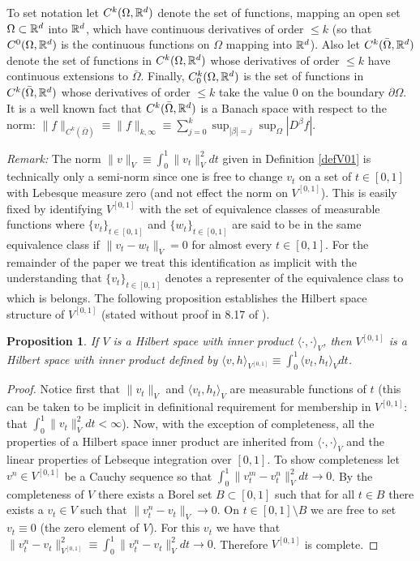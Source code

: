 \documentclass[noinfoline]{imsart}
\newtheorem{proposition}{Proposition}
\begin{document}
To set notation  let $C^k(\Omega, \Bbb R^d)$ denote the set of functions, mapping an open set $\Omega\subset \Bbb R^d$ into $\Bbb R^d$, which have continuous derivatives of order $\leq k$ (so that $C^0(\Omega, \Bbb R^d)$ is the continuous functions on $\Omega$ mapping into $\Bbb R^d$).
Also let $C^k(\bar\Omega,\Bbb R^d)$ denote the set of functions in $C^k(\Omega,\Bbb R^d)$ whose derivatives of order $\leq k$ have continuous extensions to $\bar\Omega$. Finally, $C_0^k(\Omega,\Bbb R^d)$ is the set of functions in $C^k(\bar\Omega,\Bbb R^d)$ whose derivatives of order $\leq k$ take the value $0$ on the boundary $\partial \Omega$. It is a well known fact that  $C^k(\bar\Omega,\Bbb R^d)$ is a Banach space with respect to the norm:  $ \| f \|_{C^k(\bar \Omega)}\equiv \| f \|_{k,\infty}\equiv \sum_{j=0}^k \sup_{|\beta|=j}\sup_{\Omega} |D^\beta f|$.



{\em Remark:} The norm $\| v\|_V\equiv \int_0^1 \| v_t\|^2_V dt $ given in Definition \ref{defV01} is technically only a semi-norm since one is free to change $v_t$  on a set of $t\in[0,1]$ with Lebesque measure zero (and not effect the norm on $V^{[0,1]}$). This is easily fixed by identifying  $V^{[0,1]}$ with the set of equivalence classes of measurable functions where $\{v_t\}_{t\in [0,1]}$ and $\{w_t\}_{t\in [0,1]}$ are said to be in the same equivalence class if $\| v_t-w_t \|_V=0$ for almost every $t\in [0,1]$. For the remainder of the paper we treat this identification as implicit with the understanding that $\{v_t\}_{t\in[0,1]}$  denotes a representer of the equivalence class to which is belongs. The following proposition establishes the Hilbert space structure of $V^{[0,1]}$ (stated without proof in 8.17 of \cite{you:10}).

\begin{proposition}
\label{Hspace}
If $V$ is a Hilbert space with inner product $\langle\cdot, \cdot \rangle_V$, then
$V^{[0,1]}$ is a Hilbert space with inner product  defined by $\langle v,h \rangle_{V^{[0,1]}} \equiv\int_0^1 \langle  v_t, h_t\rangle_V dt$.
\end{proposition}

\begin{proof}
Notice first that $\| v_t\|_V$ and $\langle  v_t, h_t\rangle_V$ are measurable functions of $t$ (this can be taken to be implicit in definitional requirement for membership in $V^{[0,1]}$: that $\int_0^1 \| v_t \|^2_Vdt <\infty$). Now, with the exception of completeness, all the properties of a Hilbert space inner product are inherited from $\langle  \cdot , \cdot\rangle_V$ and the linear properties of Lebseque integration over $[0,1]$.
To show completeness  let $v^n\in V^{[0,1]}$ be a Cauchy sequence so that $\int_0^1 \| v_t^m - v_t^n \|^2_V dt\rightarrow 0$. By the completeness of $V$ there exists a Borel set $B\subset[0,1]$ such that for all $t\in B$ there exists a $v_t\in V$ such that $\|v_t^n - v_t\|_V\rightarrow 0$. On $t\in [0,1]\setminus B$ we are free to set $v_t\equiv 0$ (the zero element of $V$). For this $v_t$ we have that $\|v^n_t - v_t \|_{V^{[0,1]}}^2\equiv \int_0^1 \| v_t^n - v_t \|^2_V dt\rightarrow 0$. Therefore $V^{[0,1]}$ is complete.
\end{proof}
\end{document}
